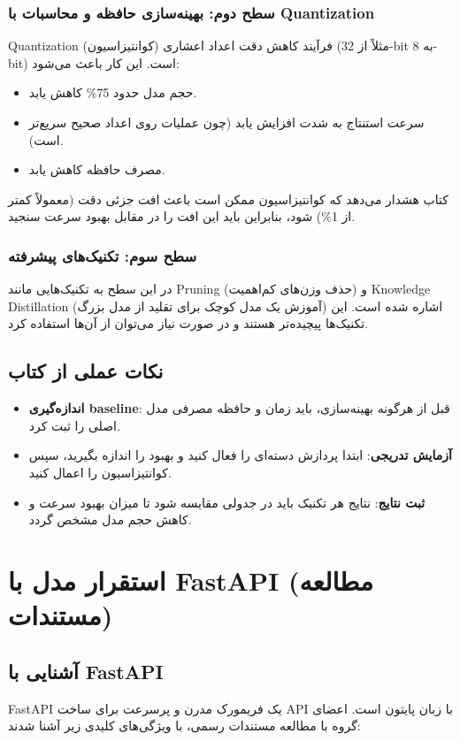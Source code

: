 \documentclass[12pt,a4paper]{report}
\newcommand{\eng}[1]{\textenglish{#1}}
\begin{document}
	\subsection{سطح دوم: بهینه‌سازی حافظه و محاسبات با Quantization}
	\eng{Quantization} (کوانتیزاسیون) فرآیند کاهش دقت اعداد اعشاری (مثلاً از \eng{32-bit} به \eng{8-bit}) است. این کار باعث می‌شود:
	\begin{itemize}
		\item حجم مدل حدود \eng{75\%} کاهش یابد.
		\item سرعت استنتاج به شدت افزایش یابد (چون عملیات روی اعداد صحیح سریع‌تر است).
		\item مصرف حافظه کاهش یابد.
	\end{itemize}
	کتاب هشدار می‌دهد که کوانتیزاسیون ممکن است باعث افت جزئی دقت (معمولاً کمتر از \eng{1\%}) شود، بنابراین باید این افت را در مقابل بهبود سرعت سنجید.
	
	\subsection{سطح سوم: تکنیک‌های پیشرفته}
	در این سطح به تکنیک‌هایی مانند \eng{Pruning} (حذف وزن‌های کم‌اهمیت) و \eng{Knowledge Distillation} (آموزش یک مدل کوچک برای تقلید از مدل بزرگ) اشاره شده است. این تکنیک‌ها پیچیده‌تر هستند و در صورت نیاز می‌توان از آن‌ها استفاده کرد.
	
	\section{نکات عملی از کتاب}
	\begin{itemize}
		\item \textbf{اندازه‌گیری baseline}: قبل از هرگونه بهینه‌سازی، باید زمان و حافظه مصرفی مدل اصلی را ثبت کرد.
		\item \textbf{آزمایش تدریجی}: ابتدا پردازش دسته‌ای را فعال کنید و بهبود را اندازه بگیرید، سپس کوانتیزاسیون را اعمال کنید.
		\item \textbf{ثبت نتایج}: نتایج هر تکنیک باید در جدولی مقایسه شود تا میزان بهبود سرعت و کاهش حجم مدل مشخص گردد.
	\end{itemize}
	
	\chapter{استقرار مدل با FastAPI (مطالعه مستندات)}
	
	\section{آشنایی با FastAPI}
	\eng{FastAPI} یک فریمورک مدرن و پرسرعت برای ساخت \eng{API} با زبان پایتون است. اعضای گروه با مطالعه مستندات رسمی، با ویژگی‌های کلیدی زیر آشنا شدند:
	
\end{document}
